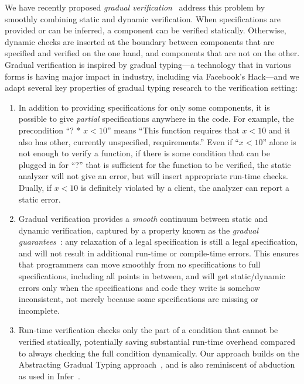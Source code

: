 \documentclass[10pt,twocolumn]{article}
\begin{document}
\begin{sloppypar}
We have recently proposed \textit{gradual verification}~\cite{baderAl:vmcai2018} address this problem by smoothly combining static and dynamic verification. When specifications are provided or can be inferred, a component can be verified statically.  Otherwise, dynamic checks are inserted at the boundary between components that are specified and verified on the one hand, and components that are not on the other. Gradual verification is inspired by gradual typing---a technology that in various forms is having major impact in industry, including via Facebook's Hack---and we adapt several key properties of gradual typing research to the verification setting:

\begin{enumerate}[leftmargin=1em]

\item
In addition to providing specifications for only some components, it is possible to give \textit{partial} specifications anywhere in the code.  For example, the precondition ``? * $x<10$'' means ``This function requires that $x<10$ and it also has other, currently unspecified, requirements.''  Even if ``$x<10$'' alone is not enough to verify a function, if there is some condition that can be plugged in for ``?'' that is sufficient for the function to be verified, the static analyzer will not give an error, but will insert appropriate run-time checks. Dually, if $x<10$ is definitely violated by a client, the analyzer can report a static error.

\item
Gradual verification provides a {\em smooth} continuum between static and dynamic verification, captured by a property known as the \textit{gradual guarantees}~\cite{siekAl:snapl2015}: any relaxation of a legal specification is still a legal specification, and will not result in additional run-time or compile-time errors.  This ensures that programmers can move smoothly from no specifications to full specifications, including all points in between, and will get static/dynamic errors only when the specifications and code they write is somehow inconsistent, not merely because some specifications are missing or incomplete.

\item
Run-time verification checks only the part of a condition that cannot be verified statically, potentially saving substantial run-time overhead compared to always checking the full condition dynamically.  Our approach builds on the Abstracting Gradual Typing approach~\cite{garciaAl:popl2016}, and is also reminiscent of abduction as used in Infer~\cite{Calcagno:2011:CSA:2049697.2049700}.
\end{enumerate}


\end{sloppypar}
\end{document}
